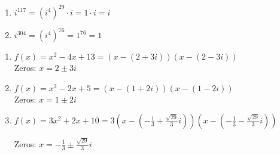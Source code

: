 \begin{multicols}{2}
\begin{enumerate}
\setcounter{enumi}{\value{HW}}
\item $i^{117} = \left(i^{4}\right)^{29} \cdot i = 1 \cdot i = i$
\item $i ^{304} = \left(i^{4}\right)^{76} = 1^{76} = 1$

\setcounter{HW}{\value{enumi}}
\end{enumerate}
\end{multicols}


\begin{enumerate}
\setcounter{enumi}{\value{HW}}

\item $f(x) = x^2-4x+13 = (x-(2+3i)) (x-(2-3i))$ \\
Zeros: $x = 2 \pm 3i$ 

\item $f(x) = x^2 - 2x + 5 = (x-(1+2i))(x-(1-2i))$ \\ 
Zeros:  $x = 1 \pm 2i$


\item $f(x) = 3x^2 + 2x +10 = 3\left(x-\left(-\frac{1}{3} + \frac{\sqrt{29}}{3} i\right) \right) \left(x-\left(-\frac{1}{3} - \frac{\sqrt{29}}{3} i\right) \right)$


Zeros:  $x = -\frac{1}{3} \pm \frac{\sqrt{29}}{3} i$

\setcounter{HW}{\value{enumi}}
\end{enumerate}


